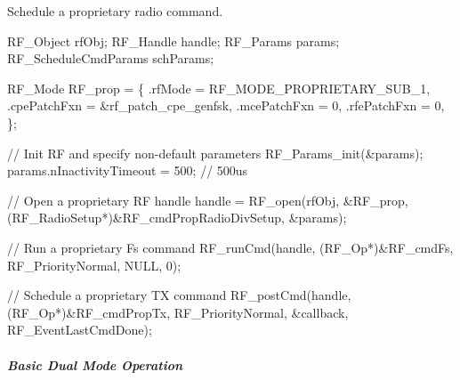 Schedule a proprietary radio command. 
\begin{DoxyCode}
RF_Object rfObj;
RF_Handle handle;
RF_Params params;
RF_ScheduleCmdParams schParams;

RF_Mode RF\_prop =
\{
    .rfMode      = RF\_MODE\_PROPRIETARY\_SUB\_1,
    .cpePatchFxn = &rf\_patch\_cpe\_genfsk,
    .mcePatchFxn = 0,
    .rfePatchFxn = 0,
\};

\textcolor{comment}{// Init RF and specify non-default parameters}
RF_Params_init(&params);
params.nInactivityTimeout = 500; \textcolor{comment}{// 500us}

\textcolor{comment}{// Open a proprietary RF handle}
handle = RF_open(rfObj, &RF\_prop, (RF_RadioSetup*)&RF\_cmdPropRadioDivSetup, &params);

\textcolor{comment}{// Run a proprietary Fs command}
RF_runCmd(handle, (RF_Op*)&RF\_cmdFs, RF_PriorityNormal, NULL, 0);

\textcolor{comment}{// Schedule a proprietary TX command}
RF_postCmd(handle, (RF_Op*)&RF\_cmdPropTx, RF_PriorityNormal, &callback, 
      RF_EventLastCmdDone);
\end{DoxyCode}


\subparagraph*{Basic Dual Mode Operation}

